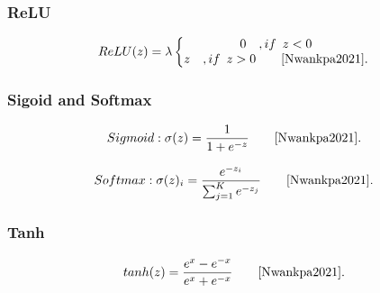 \subsubsection{ReLU}

\begin{equation}
ReLU(z) = \lambda
\left\{
\begin{matrix}
0 \quad , if \enspace z < 0\\
z \quad, if \enspace z > 0 \qquad \cite{Nwankpa2021}.
\end{matrix}
\right.
\label{eq:relu}
\end{equation}

\vskip 0.4in

\begin{minipage}{\linewidth}
\label{fig:activations_relu}  
\end{minipage}

\vskip 0.4in

\subsubsection{Sigoid and Softmax}

\begin{equation}
Sigmoid: \sigma(z) = \frac{1}{1+e^{-z}} \qquad \cite{Nwankpa2021}.
\label{eq:sigmoid}
\end{equation}

\begin{equation}
Softmax: \sigma(z)_{i} = \frac{e^{-z_{i}}}{\sum_{j=1}^{K}e^{-z_{j}}} \qquad \cite{Nwankpa2021}.
\label{eq:softmax}
\end{equation}

\vskip 0.4in

\begin{minipage}{\linewidth}
\label{fig:activations_sigmoid}  
\end{minipage}

\vskip 0.4in

\subsubsection{Tanh}

\begin{equation}
tanh(z) = \frac{e^{x}-e^{-x}}{e^{x}+e^{-x}} \qquad \cite{Nwankpa2021}.
\label{eq:tanh}
\end{equation}


